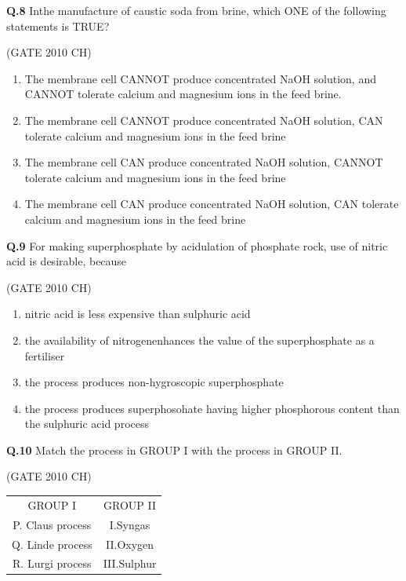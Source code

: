 \documentclass[journal,12pt,onecolumn]{exam}
\theoremstyle{remark}
\begin{document}
   \noindent
   \textbf{Q.8}
   Inthe manufacture of caustic soda from brine, which ONE of the following statements is TRUE?
   
  \hfill{(GATE 2010 CH)}\\
   
   \begin{enumerate}
       \item The membrane cell CANNOT produce concentrated NaOH solution, and CANNOT tolerate calcium and magnesium ions in the feed brine.
       \item The membrane cell CANNOT produce concentrated NaOH solution, CAN tolerate calcium and magnesium ions in the feed brine
       \item  The membrane cell CAN produce concentrated NaOH solution, CANNOT tolerate calcium and magnesium ions in the feed brine 
       \item  The membrane cell CAN produce concentrated NaOH solution, CAN tolerate calcium and magnesium ions in the feed brine
   \end{enumerate}

   \noindent
   \textbf{Q.9}
   For making superphosphate by acidulation of phosphate rock, use of nitric acid is desirable, because
   
\hfill{(GATE 2010 CH)}\\

   \begin{enumerate}
       \item nitric acid is less expensive than sulphuric acid
       \item the availability of nitrogenenhances the value of the superphosphate as a fertiliser
       \item the process produces non-hygroscopic superphosphate
       \item the process produces superphosohate having higher phosphorous content than the sulphuric acid process
   \end{enumerate}


   \noindent
   \textbf{Q.10}
   Match the process in GROUP I with the process in GROUP II.

\hfill{(GATE 2010 CH)}\\
   
       \begin{tabular}{c|c}
       GROUP I & GROUP II \\
 P. Claus process & I.Syngas\\
 Q. Linde process & II.Oxygen\\
 R. Lurgi process & III.Sulphur\\
       \end{tabular}
\end{document}
